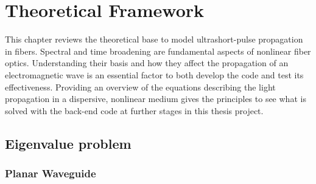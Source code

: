 \chapter{Theoretical Framework}

This chapter reviews the theoretical base to model ultrashort-pulse propagation in fibers. Spectral and time broadening are fundamental aspects of nonlinear fiber optics. Understanding their basis and how they affect the propagation of an electromagnetic wave is an essential factor to both develop the code and test its effectiveness. Providing an overview of the equations describing the light propagation in a dispersive, nonlinear medium gives the principles to see what is solved with the back-end code at further stages in this thesis project.

\section{Eigenvalue problem}

    \subsection{Planar Waveguide}
        
        
        
